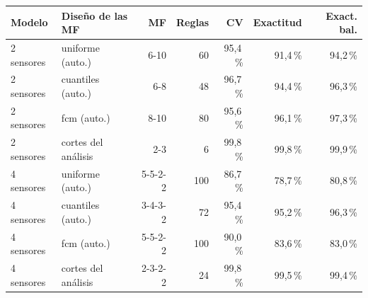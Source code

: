 \begin{tabular}{llrrrrr}
\toprule
Modelo & Diseño de las MF & MF & Reglas & CV & Exactitud & Exact. bal. \\
\midrule
2 sensores & uniforme (auto.) & 6-10 & 60 & 95,4\,\% & 91,4\,\% & 94,2\,\% \\
2 sensores & cuantiles (auto.) & 6-8 & 48 & 96,7\,\% & 94,4\,\% & 96,3\,\% \\
2 sensores & fcm (auto.) & 8-10 & 80 & 95,6\,\% & 96,1\,\% & 97,3\,\% \\
2 sensores & cortes del análisis & 2-3 & 6 & 99,8\,\% & 99,8\,\% & 99,9\,\% \\
4 sensores & uniforme (auto.) & 5-5-2-2 & 100 & 86,7\,\% & 78,7\,\% & 80,8\,\% \\
4 sensores & cuantiles (auto.) & 3-4-3-2 & 72 & 95,4\,\% & 95,2\,\% & 96,3\,\% \\
4 sensores & fcm (auto.) & 5-5-2-2 & 100 & 90,0\,\% & 83,6\,\% & 83,0\,\% \\
4 sensores & cortes del análisis & 2-3-2-2 & 24 & 99,8\,\% & 99,5\,\% & 99,4\,\% \\
\bottomrule
\end{tabular}
